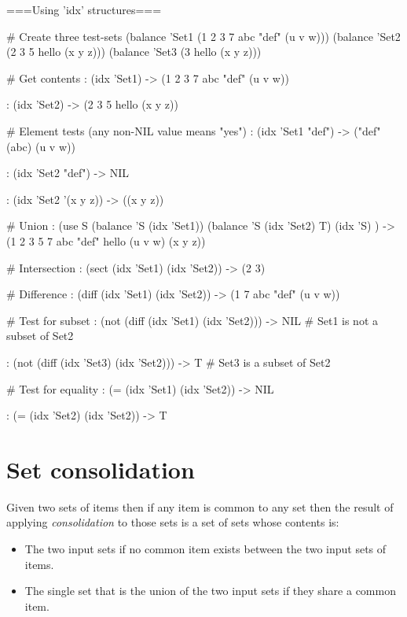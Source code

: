 \begin{wideverbatim}


===Using 'idx' structures===

# Create three test-sets
(balance 'Set1 (1 2 3 7 abc "def" (u v w)))
(balance 'Set2 (2 3 5 hello (x y z)))
(balance 'Set3 (3 hello (x y z)))


# Get contents
: (idx 'Set1)
-> (1 2 3 7 abc "def" (u v w))

: (idx 'Set2)
-> (2 3 5 hello (x y z))


# Element tests (any non-NIL value means "yes")
: (idx 'Set1 "def")
-> ("def" (abc) (u v w))

: (idx 'Set2 "def")
-> NIL

: (idx 'Set2 '(x y z))
-> ((x y z))


# Union
: (use S
   (balance 'S (idx 'Set1))
   (balance 'S (idx 'Set2) T)
   (idx 'S) )
-> (1 2 3 5 7 abc "def" hello (u v w) (x y z))


# Intersection
: (sect (idx 'Set1) (idx 'Set2))
-> (2 3)


# Difference
: (diff (idx 'Set1) (idx 'Set2))
-> (1 7 abc "def" (u v w))


\end{wideverbatim}

\begin{wideverbatim}


# Test for subset
: (not (diff (idx 'Set1) (idx 'Set2)))
-> NIL  # Set1 is not a subset of Set2

: (not (diff (idx 'Set3) (idx 'Set2)))
-> T  # Set3 is a subset of Set2


# Test for equality
: (= (idx 'Set1) (idx 'Set2))
-> NIL

: (= (idx 'Set2) (idx 'Set2))
-> T

\end{wideverbatim}

\pagebreak{}
\section*{Set consolidation}

Given two sets of items then if any item is common to any set then the
result of applying \emph{consolidation} to those sets is a set of sets
whose contents is:

\begin{itemize}
\item
  The two input sets if no common item exists between the two input sets
  of items.
\item
  The single set that is the union of the two input sets if they share a
  common item.
\end{itemize}

